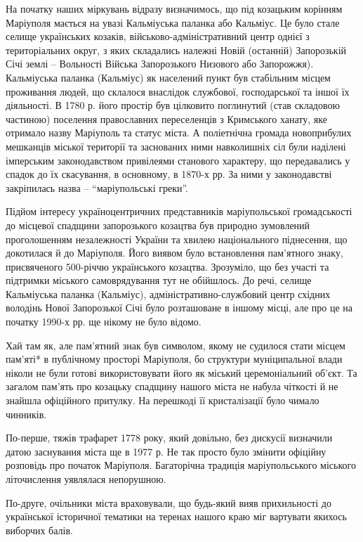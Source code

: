 На початку наших міркувань відразу визначимось, що під козацьким корінням
Маріуполя мається на увазі Кальміуська паланка або Кальміус. Це було стале
селище українських козаків, військово-адміністративний центр однієї з
територіальних округ, з яких складались належні Новій (останній) Запорозькій
Січі землі – Вольності Війська Запорозького Низового або Запорожжя).
Кальміуська паланка (Кальміус) як населений пункт був стабільним місцем
проживання людей, що склалося внаслідок службової, господарської та іншої їх
діяльності. В 1780 р. його простір був цілковито поглинутий (став складовою
частиною) поселення православних переселенців з Кримського ханату, яке отримало
назву Маріуполь та статус міста. А поліетнічна громада новоприбулих мешканців
міської території та заснованих ними навколишніх сіл були наділені імперським
законодавством привілеями станового характеру, що передавались у спадок до їх
скасування, в основному, в 1870-х рр. За ними у законодавстві закріпилась назва
– \enquote{маріупольські греки}.

Підйом інтересу україноцентричних представників маріупольської громадськості до
місцевої спадщини запорозького козацтва був природно зумовлений проголошенням
незалежності України та хвилею національного піднесення, що докотилася й до
Маріуполя. Його виявом було встановлення пам'ятного знаку, присвяченого
500-річчю українського козацтва. Зрозуміло, що без участі та підтримки міського
самоврядування тут не обійшлось. До речі, селище Кальміуська паланка
(Кальміус), адміністративно-службовий центр східних володінь Нової Запорозької
Січі було розташоване в іншому місці, але про це на початку 1990-х рр. ще
нікому не було відомо.


Хай там як, але пам'ятний знак був символом, якому не судилося стати місцем
пам'яті* в публічному просторі Маріуполя, бо структури муніципальної влади
ніколи не були готові використовувати його як міський церемоніальний об'єкт. Та
загалом пам'ять про козацьку спадщину нашого міста не набула чіткості й не
знайшла офіційного притулку. На перешкоді її кристалізації було чимало
чинників.

По-перше, тяжів трафарет 1778 року, який довільно, без дискусії визначили датою
заснування міста ще в 1977 р. Не так просто було змінити офіційну розповідь про
початок Маріуполя. Багаторічна традиція маріупольського міського літочислення
уявлялася непорушною. 

По-друге, очільники міста враховували, що будь-який вияв прихильності до
української історичної тематики на теренах нашого краю міг вартувати якихось
виборчих балів.

